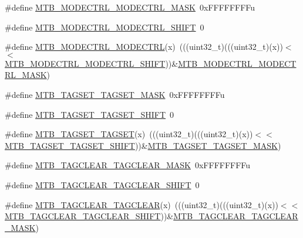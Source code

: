 \begin{DoxyCompactItemize}
\item 
\#define \hyperlink{group___m_t_b___register___masks_ga1d66deff1d032af57ab9b808a240fa3a}{M\+T\+B\+\_\+\+M\+O\+D\+E\+C\+T\+R\+L\+\_\+\+M\+O\+D\+E\+C\+T\+R\+L\+\_\+\+M\+A\+SK}~0x\+F\+F\+F\+F\+F\+F\+F\+Fu
\item 
\#define \hyperlink{group___m_t_b___register___masks_gaa771d72e2a22b472cb0f5daceeef22bb}{M\+T\+B\+\_\+\+M\+O\+D\+E\+C\+T\+R\+L\+\_\+\+M\+O\+D\+E\+C\+T\+R\+L\+\_\+\+S\+H\+I\+FT}~0
\item 
\#define \hyperlink{group___m_t_b___register___masks_gaff04cf5dbefa8e6e2c809c425d21c150}{M\+T\+B\+\_\+\+M\+O\+D\+E\+C\+T\+R\+L\+\_\+\+M\+O\+D\+E\+C\+T\+RL}(x)~(((uint32\+\_\+t)(((uint32\+\_\+t)(x))$<$$<$\hyperlink{group___m_t_b___register___masks_gaa771d72e2a22b472cb0f5daceeef22bb}{M\+T\+B\+\_\+\+M\+O\+D\+E\+C\+T\+R\+L\+\_\+\+M\+O\+D\+E\+C\+T\+R\+L\+\_\+\+S\+H\+I\+FT}))\&\hyperlink{group___m_t_b___register___masks_ga1d66deff1d032af57ab9b808a240fa3a}{M\+T\+B\+\_\+\+M\+O\+D\+E\+C\+T\+R\+L\+\_\+\+M\+O\+D\+E\+C\+T\+R\+L\+\_\+\+M\+A\+SK})
\item 
\#define \hyperlink{group___m_t_b___register___masks_gae10888ce190a167551d534dac7019f9d}{M\+T\+B\+\_\+\+T\+A\+G\+S\+E\+T\+\_\+\+T\+A\+G\+S\+E\+T\+\_\+\+M\+A\+SK}~0x\+F\+F\+F\+F\+F\+F\+F\+Fu
\item 
\#define \hyperlink{group___m_t_b___register___masks_gac7d7e704f5b16991586fea0dc061bc3d}{M\+T\+B\+\_\+\+T\+A\+G\+S\+E\+T\+\_\+\+T\+A\+G\+S\+E\+T\+\_\+\+S\+H\+I\+FT}~0
\item 
\#define \hyperlink{group___m_t_b___register___masks_ga2988aa0fa7c14b545fe30a05dcc10c67}{M\+T\+B\+\_\+\+T\+A\+G\+S\+E\+T\+\_\+\+T\+A\+G\+S\+ET}(x)~(((uint32\+\_\+t)(((uint32\+\_\+t)(x))$<$$<$\hyperlink{group___m_t_b___register___masks_gac7d7e704f5b16991586fea0dc061bc3d}{M\+T\+B\+\_\+\+T\+A\+G\+S\+E\+T\+\_\+\+T\+A\+G\+S\+E\+T\+\_\+\+S\+H\+I\+FT}))\&\hyperlink{group___m_t_b___register___masks_gae10888ce190a167551d534dac7019f9d}{M\+T\+B\+\_\+\+T\+A\+G\+S\+E\+T\+\_\+\+T\+A\+G\+S\+E\+T\+\_\+\+M\+A\+SK})
\item 
\#define \hyperlink{group___m_t_b___register___masks_ga50dabf07ab4f88615242b68c0466aab0}{M\+T\+B\+\_\+\+T\+A\+G\+C\+L\+E\+A\+R\+\_\+\+T\+A\+G\+C\+L\+E\+A\+R\+\_\+\+M\+A\+SK}~0x\+F\+F\+F\+F\+F\+F\+F\+Fu
\item 
\#define \hyperlink{group___m_t_b___register___masks_gac1ba97e3448e183a4d00b63060786290}{M\+T\+B\+\_\+\+T\+A\+G\+C\+L\+E\+A\+R\+\_\+\+T\+A\+G\+C\+L\+E\+A\+R\+\_\+\+S\+H\+I\+FT}~0
\item 
\#define \hyperlink{group___m_t_b___register___masks_ga2a3e47e7cacd4d3812c5371fd6d3fa0b}{M\+T\+B\+\_\+\+T\+A\+G\+C\+L\+E\+A\+R\+\_\+\+T\+A\+G\+C\+L\+E\+AR}(x)~(((uint32\+\_\+t)(((uint32\+\_\+t)(x))$<$$<$\hyperlink{group___m_t_b___register___masks_gac1ba97e3448e183a4d00b63060786290}{M\+T\+B\+\_\+\+T\+A\+G\+C\+L\+E\+A\+R\+\_\+\+T\+A\+G\+C\+L\+E\+A\+R\+\_\+\+S\+H\+I\+FT}))\&\hyperlink{group___m_t_b___register___masks_ga50dabf07ab4f88615242b68c0466aab0}{M\+T\+B\+\_\+\+T\+A\+G\+C\+L\+E\+A\+R\+\_\+\+T\+A\+G\+C\+L\+E\+A\+R\+\_\+\+M\+A\+SK})
$$
\end{DoxyCompactItemize}
